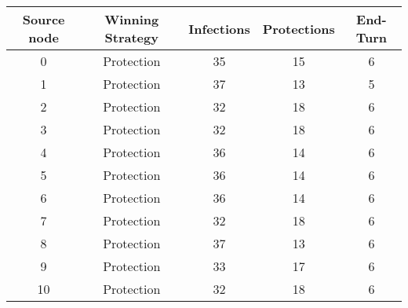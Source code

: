 \documentclass[results.tex]{subfiles}
\begin{document}
    \begin{center}
        \begin{tabular}{| c || c | c | c | c |}
            \hline
            {\bfseries Source node} & {\bfseries Winning Strategy} & {\bfseries Infections} & {\bfseries Protections}
            & {\bfseries End-Turn}
            \\  %
            \hline\hline
            0                       & Protection                   & 35                     & 15                      & 6                    \\
            \hline
            1                       & Protection                   & 37                     & 13                      & 5                    \\
            \hline
            2                       & Protection                   & 32                     & 18                      & 6                    \\
            \hline
            3                       & Protection                   & 32                     & 18                      & 6                    \\
            \hline
            4                       & Protection                   & 36                     & 14                      & 6                    \\
            \hline
            5                       & Protection                   & 36                     & 14                      & 6                    \\
            \hline
            6                       & Protection                   & 36                     & 14                      & 6                    \\
            \hline
            7                       & Protection                   & 32                     & 18                      & 6                    \\
            \hline
            8                       & Protection                   & 37                     & 13                      & 6                    \\
            \hline
            9                       & Protection                   & 33                     & 17                      & 6                    \\
            \hline
            10                      & Protection                   & 32                     & 18                      & 6                    \\

\end{tabular}
\end{center}
\end{document}
